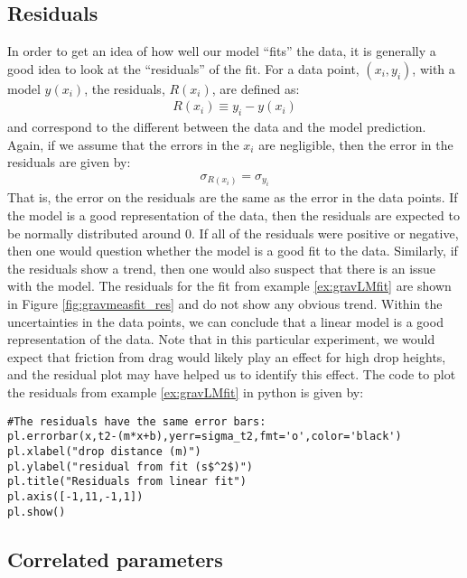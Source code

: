 \subsection{Residuals}
In order to get an idea of how well our model ``fits'' the data, it is generally a good idea to look at the ``residuals'' of the fit. For a data point, $(x_i,y_i)$, with a model $y(x_i)$, the residuals, $R(x_i)$, are defined as:
\begin{align}
R(x_i)\equiv y_i-y(x_i)
\end{align}
and correspond to the different between the data and the model prediction. Again, if we assume that the errors in the $x_i$ are negligible, then the error in the residuals are given by:
\begin{align}
\sigma_{R(x_i)}=\sigma_{y_i}
\end{align}
That is, the error on the residuals are the same as the error in the data points. If the model is a good representation of the data, then the residuals are expected to be normally distributed around 0. If all of the residuals were positive or negative, then one would question whether the model is a good fit to the data. Similarly, if the residuals show a trend, then one would also suspect that there is an issue with the model. The residuals for the fit from example \ref{ex:gravLMfit} are shown in Figure \ref{fig:gravmeasfit_res} and do not show any obvious trend. Within the uncertainties in the data points, we can conclude that a linear model is a good representation of the data. Note that in this particular experiment, we would expect that friction from drag would likely play an effect for high drop heights, and the residual plot may have helped us to identify this effect. The code to plot the residuals from example \ref{ex:gravLMfit} in python is given by:
\begin{lstlisting}[frame=single] 
#The residuals have the same error bars:
pl.errorbar(x,t2-(m*x+b),yerr=sigma_t2,fmt='o',color='black')
pl.xlabel("drop distance (m)")
pl.ylabel("residual from fit (s$^2$)")
pl.title("Residuals from linear fit")
pl.axis([-1,11,-1,1])
pl.show()
\end{lstlisting} 



\subsection{Correlated parameters}

